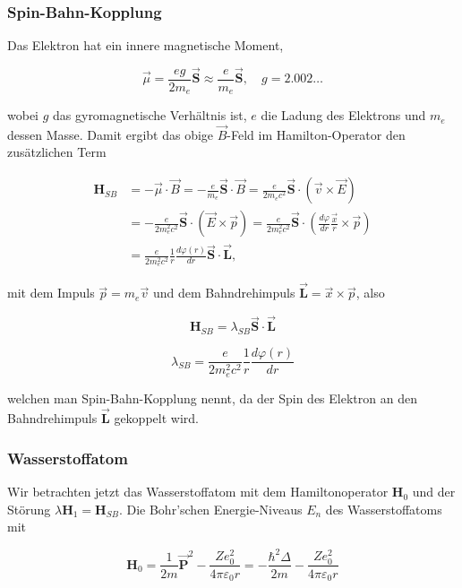\documentclass[10pt, letterpaper]{article}
\begin{document}
\subsubsection*{Spin-Bahn-Kopplung}
Das Elektron hat ein innere magnetische Moment,

$$
\vec{\mu}=\frac{e g}{2 m_{e}} \overrightarrow{\mathbf{S}} \approx \frac{e}{m_{e}} \overrightarrow{\mathbf{S}}, \quad g=2.002 \ldots
$$

wobei $g$ das gyromagnetische Verhältnis ist, $e$ die Ladung des Elektrons und $m_{e}$ dessen Masse. Damit ergibt das obige $\vec{B}$-Feld im Hamilton-Operator den zusätzlichen Term

$$
\begin{aligned}
\mathbf{H}_{S B} & =-\vec{\mu} \cdot \vec{B}=-\frac{e}{m_{e}} \overrightarrow{\mathbf{S}} \cdot \vec{B}=\frac{e}{2 m_{e} c^{2}} \overrightarrow{\mathbf{S}} \cdot(\vec{v} \times \vec{E}) \\
& =-\frac{e}{2 m_{e}^{2} c^{2}} \overrightarrow{\mathbf{S}} \cdot(\vec{E} \times \vec{p})=\frac{e}{2 m_{e}^{2} c^{2}} \overrightarrow{\mathbf{S}} \cdot\left(\frac{d \varphi}{d r} \frac{\vec{x}}{r} \times \vec{p}\right) \\
& =\frac{e}{2 m_{e}^{2} c^{2}} \frac{1}{r} \frac{d \varphi(r)}{d r} \overrightarrow{\mathbf{S}} \cdot \overrightarrow{\mathbf{L}},
\end{aligned}
$$

mit dem Impuls $\vec{p}=m_{e} \vec{v}$ und dem Bahndrehimpuls $\overrightarrow{\mathbf{L}}=\vec{x} \times \vec{p}$, also

$$
\mathbf{H}_{S B}=\lambda_{S B} \overrightarrow{\mathbf{S}} \cdot \overrightarrow{\mathbf{L}}
$$

$$
\lambda_{S B}=\frac{e}{2 m_{e}^{2} c^{2}} \frac{1}{r} \frac{d \varphi(r)}{d r}
$$

welchen man Spin-Bahn-Kopplung nennt, da der Spin des Elektron an den Bahndrehimpuls $\overrightarrow{\mathbf{L}}$ gekoppelt wird.

\subsubsection*{Wasserstoffatom}
Wir betrachten jetzt das Wasserstoffatom mit dem Hamiltonoperator $\mathbf{H}_{0}$ und der Störung $\lambda \mathbf{H}_{1}=\mathbf{H}_{S B}$. Die Bohr'schen Energie-Niveaus $E_{n}$ des Wasserstoffatoms mit

$$
\mathbf{H}_{0}=\frac{1}{2 m} \overrightarrow{\mathbf{P}}^{2}-\frac{Z e_{0}^{2}}{4 \pi \varepsilon_{0} r}=-\frac{\hbar^{2} \Delta}{2 m}-\frac{Z e_{0}^{2}}{4 \pi \varepsilon_{0} r}
$$
\end{document}
